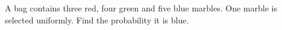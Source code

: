 A bag contains three red, four green and five blue marbles. One marble is selected uniformly. Find the probability it is blue.
